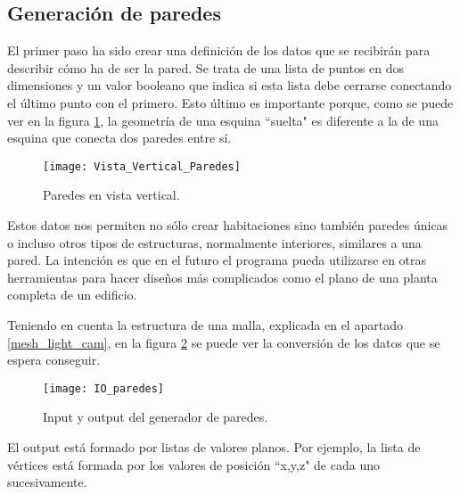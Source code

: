 
\subsection{Generación de paredes}
\label{wall_gen_design}
El primer paso ha sido crear una definición de los datos que se recibirán para describir cómo ha de ser la pared. Se trata de una lista de puntos en dos dimensiones y un valor booleano que indica si esta lista debe cerrarse conectando el último punto con el primero. Esto último es importante porque, como se puede ver en la figura \ref{fig:vertical_view_walls}, la geometría de una esquina ``suelta" es diferente a la de una esquina que conecta dos paredes entre sí.

\begin{figure}[h]
    \centering
    \texttt{[image: Vista\_Vertical\_Paredes]}
    \caption{Paredes en vista vertical.}
    \label{fig:vertical_view_walls}
\end{figure}

Estos datos nos permiten no sólo crear habitaciones sino también paredes únicas o incluso otros tipos de estructuras, normalmente interiores, similares a una pared. La intención es que en el futuro el programa pueda utilizarse en otras herramientas para hacer diseños más complicados como el plano de una planta completa de un edificio.

Teniendo en cuenta la estructura de una malla, explicada en el apartado \ref{mesh_light_cam}, en la figura \ref{fig:io_generatewalls} se puede ver la conversión de los datos que se espera conseguir.

\begin{figure}[H]
    \centering
    \texttt{[image: IO\_paredes]}
    \caption{Input y output del generador de paredes.}
    \label{fig:io_generatewalls}
\end{figure}

El output está formado por listas de valores planos. Por ejemplo, la lista de vértices está formada por los valores de posición ``x,y,z" de cada uno sucesivamente.


